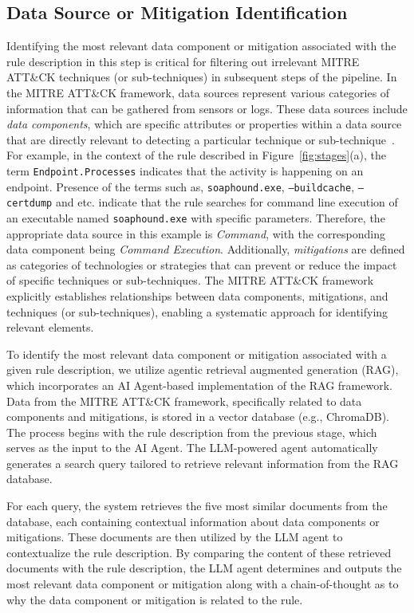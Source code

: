 \subsection{Data Source or Mitigation Identification}
Identifying the most relevant data component or mitigation associated with the rule description in this step is critical for filtering out irrelevant MITRE ATT\&CK techniques (or sub-techniques) in subsequent steps of the pipeline.
In the MITRE ATT\&CK framework, data sources represent various categories of information that can be gathered from sensors or logs. 
These data sources include \textit{data components}, which are specific attributes or properties within a data source that are directly relevant to detecting a particular technique or sub-technique~. 
For example, in the context of the rule described in Figure~\ref{fig:stages}(a), the term \texttt{Endpoint.Processes} indicates that the activity is happening on an endpoint. 
Presence of the terms such as, \texttt{soaphound.exe}, \texttt{--buildcache}, \texttt{--certdump} and etc. indicate that the rule searches for command line execution of an executable named \texttt{soaphound.exe} with specific parameters. 
Therefore, the appropriate data source in this example is \textit{Command}, with the corresponding data component being \textit{Command Execution}.
Additionally, \textit{mitigations} are defined as categories of technologies or strategies that can prevent or reduce the impact of specific techniques or sub-techniques. 
The MITRE ATT\&CK framework explicitly establishes relationships between data components, mitigations, and techniques (or sub-techniques), enabling a systematic approach for identifying relevant elements.

To identify the most relevant data component or mitigation associated with a given rule description, we utilize agentic retrieval augmented generation (RAG), which incorporates an AI Agent-based implementation of the RAG framework.
Data from the MITRE ATT\&CK framework, specifically related to data components and mitigations, is stored in a vector database (e.g., ChromaDB). 
The process begins with the rule description from the previous stage, which serves as the input to the AI Agent. 
The LLM-powered agent automatically generates a search query tailored to retrieve relevant information from the RAG database.

For each query, the system retrieves the five most similar documents from the database, each containing contextual information about data components or mitigations. 
These documents are then utilized by the LLM agent to contextualize the rule description. 
By comparing the content of these retrieved documents with the rule description, the LLM agent determines and outputs the most relevant data component or mitigation along with a chain-of-thought as to why the data component or mitigation is related to the rule.


